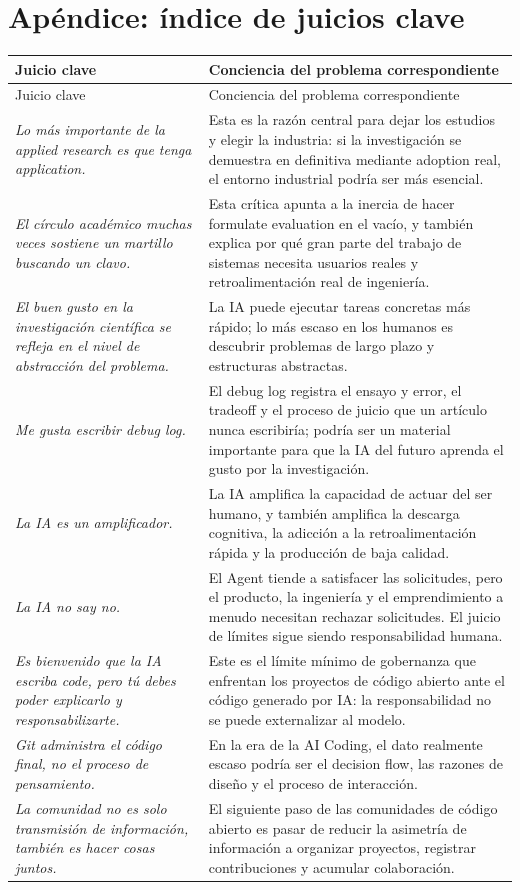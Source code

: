 \section*{Apéndice: índice de juicios clave}

\begin{longtable}{>{\raggedright\arraybackslash}p{} >{\raggedright\arraybackslash}p{}}
\toprule
Juicio clave & Conciencia del problema correspondiente \\
\midrule
\endfirsthead
\toprule
Juicio clave & Conciencia del problema correspondiente \\
\midrule
\endhead
\textit{Lo más importante de la applied research es que tenga application.} & Esta es la razón central para dejar los estudios y elegir la industria: si la investigación se demuestra en definitiva mediante adoption real, el entorno industrial podría ser más esencial. \\
\textit{El círculo académico muchas veces sostiene un martillo buscando un clavo.} & Esta crítica apunta a la inercia de hacer formulate evaluation en el vacío, y también explica por qué gran parte del trabajo de sistemas necesita usuarios reales y retroalimentación real de ingeniería. \\
\textit{El buen gusto en la investigación científica se refleja en el nivel de abstracción del problema.} & La IA puede ejecutar tareas concretas más rápido; lo más escaso en los humanos es descubrir problemas de largo plazo y estructuras abstractas. \\
\textit{Me gusta escribir debug log.} & El debug log registra el ensayo y error, el tradeoff y el proceso de juicio que un artículo nunca escribiría; podría ser un material importante para que la IA del futuro aprenda el gusto por la investigación. \\
\textit{La IA es un amplificador.} & La IA amplifica la capacidad de actuar del ser humano, y también amplifica la descarga cognitiva, la adicción a la retroalimentación rápida y la producción de baja calidad. \\
\textit{La IA no say no.} & El Agent tiende a satisfacer las solicitudes, pero el producto, la ingeniería y el emprendimiento a menudo necesitan rechazar solicitudes. El juicio de límites sigue siendo responsabilidad humana. \\
\textit{Es bienvenido que la IA escriba code, pero tú debes poder explicarlo y responsabilizarte.} & Este es el límite mínimo de gobernanza que enfrentan los proyectos de código abierto ante el código generado por IA: la responsabilidad no se puede externalizar al modelo. \\
\textit{Git administra el código final, no el proceso de pensamiento.} & En la era de la AI Coding, el dato realmente escaso podría ser el decision flow, las razones de diseño y el proceso de interacción. \\
\textit{La comunidad no es solo transmisión de información, también es hacer cosas juntos.} & El siguiente paso de las comunidades de código abierto es pasar de reducir la asimetría de información a organizar proyectos, registrar contribuciones y acumular colaboración. \\
\bottomrule
\end{longtable}


